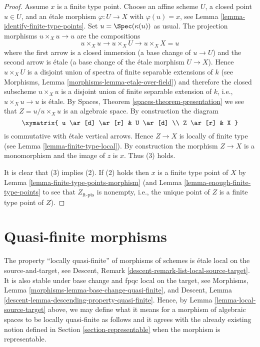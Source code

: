 \begin{proof}
Assume $x$ is a finite type point. Choose an affine scheme $U$,
a closed point $u \in U$, and an \'etale morphism $\varphi : U \to X$
with $\varphi(u) = x$, see
Lemma \ref{lemma-identify-finite-type-points}.
Set $u = \Spec(\kappa(u))$ as usual. The projection morphisms
$u \times_X u \to u$ are the compositions
$$
u \times_X u \to u \times_X U \to u \times_X X = u
$$
where the first arrow is a closed immersion (a base change of
$u \to U$) and the second arrow is \'etale (a base change of the \'etale
morphism $U \to X$). Hence $u \times_X U$ is a disjoint union of spectra
of finite separable extensions of $k$ (see
Morphisms, Lemma \ref{morphisms-lemma-etale-over-field})
and therefore the closed subscheme $u \times_X u$ is a disjoint union of
finite separable extension of $k$, i.e., $u \times_X u \to u$ is \'etale. By
Spaces, Theorem \ref{spaces-theorem-presentation}
we see that $Z = u/u \times_X u$ is an algebraic space. By construction
the diagram
$$
\xymatrix{
u \ar[d] \ar[r] & U \ar[d] \\
Z \ar[r] & X
}
$$
is commutative with \'etale vertical arrows. Hence $Z \to X$ is locally
of finite type (see
Lemma \ref{lemma-finite-type-local}).
By construction the morphism $Z \to X$ is a monomorphism and
the image of $z$ is $x$. Thus (3) holds.

\medskip\noindent
It is clear that (3) implies (2).
If (2) holds then $x$ is a finite type point of $X$ by
Lemma \ref{lemma-finite-type-points-morphism}
(and
Lemma \ref{lemma-enough-finite-type-points}
to see that $Z_{\text{ft-pts}}$ is nonempty, i.e., the unique point of
$Z$ is a finite type point of $Z$).
\end{proof}








\section{Quasi-finite morphisms}
\label{section-quasi-finite}

\noindent
The property ``locally quasi-finite'' of morphisms of schemes is
\'etale local on the source-and-target, see
Descent, Remark \ref{descent-remark-list-local-source-target}.
It is also stable under base change and fpqc local on the target, see
Morphisms, Lemma \ref{morphisms-lemma-base-change-quasi-finite}, and
Descent, Lemma \ref{descent-lemma-descending-property-quasi-finite}.
Hence, by
Lemma \ref{lemma-local-source-target}
above, we may define what it means for a morphism of algebraic spaces
to be locally quasi-finite as
follows and it agrees with the already existing notion defined in
Section \ref{section-representable}
when the morphism is representable.

